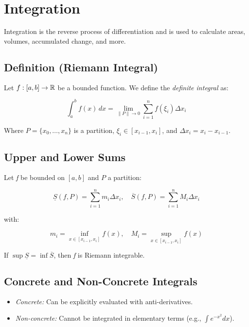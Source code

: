 \newpage
\section{Integration}

Integration is the reverse process of differentiation and is used to calculate areas, volumes, 
accumulated change, and more.

\subsection{Definition (Riemann Integral)}

Let \(f: [a, b] \to \mathbb{R}\) be a bounded function. We define the \emph{definite integral} as:

\[
    \int_a^b f(x)\,dx = \lim_{\|P\| \to 0} \sum_{i=1}^n f(\xi_i)\Delta x_i
\]

Where \(P = \{x_0, \dots, x_n\}\) is a partition, \(\xi_i \in [x_{i-1}, x_i]\), and 
\(\Delta x_i = x_i - x_{i-1}\).

\subsection{Upper and Lower Sums}

Let \emph{f} be bounded on \([a, b]\) and \(P\) a partition:

\[
    \underline{S}(f, P) = \sum_{i=1}^n m_i \Delta x_i, \quad
    \overline{S}(f, P) = \sum_{i=1}^n M_i \Delta x_i
\]

with:

\[
    m_i = \inf_{x \in [x_{i-1}, x_i]} f(x), \quad
    M_i = \sup_{x \in [x_{i-1}, x_i]} f(x)
\]

If \(\sup \underline{S} = \inf \overline{S}\), then \emph{f} is Riemann integrable.

\subsection{Concrete and Non-Concrete Integrals}

\begin{itemize}

    \item \emph{Concrete:} Can be explicitly evaluated with anti-derivatives.

    \item \emph{Non-concrete:} Cannot be integrated in elementary terms (e.g., \(\int e^{-x^2} dx\)).

\end{itemize}

